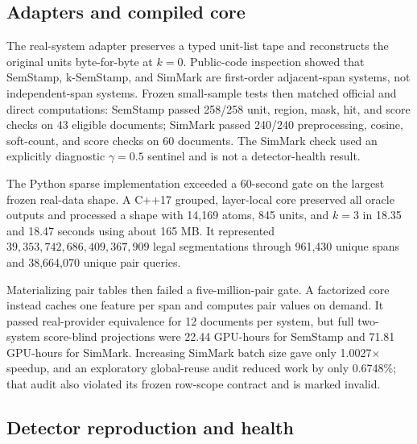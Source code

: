 \documentclass[10pt]{article}
\begin{document}
\subsection{Adapters and compiled core}

The real-system adapter preserves a typed unit-list tape and reconstructs the
original units byte-for-byte at $k=0$. Public-code inspection showed that
SemStamp, k-SemStamp, and SimMark are first-order adjacent-span systems, not
independent-span systems. Frozen small-sample tests then matched official and
direct computations: SemStamp passed 258/258 unit, region, mask, hit, and
score checks on 43 eligible documents; SimMark passed 240/240 preprocessing,
cosine, soft-count, and score checks on 60 documents. The SimMark check used
an explicitly diagnostic $\gamma=0.5$ sentinel and is not a detector-health
result.

The Python sparse implementation exceeded a 60-second gate on the largest
frozen real-data shape. A C++17 grouped, layer-local core preserved all oracle
outputs and processed a shape with 14,169 atoms, 845 units, and $k=3$ in
18.35 and 18.47 seconds using about 165 MB. It represented
$39{,}353{,}742{,}686{,}409{,}367{,}909$ legal segmentations through
961,430 unique spans and 38,664,070 unique pair queries.

Materializing pair tables then failed a five-million-pair gate. A factorized
core instead caches one feature per span and computes pair values on demand.
It passed real-provider equivalence for 12 documents per system, but full
two-system score-blind projections were 22.44 GPU-hours for SemStamp and
71.81 GPU-hours for SimMark. Increasing SimMark batch size gave only
1.0027$\times$ speedup, and an exploratory global-reuse audit reduced work by
only 0.6748\%; that audit also violated its frozen row-scope contract and is
marked invalid.

\subsection{Detector reproduction and health}
\end{document}
